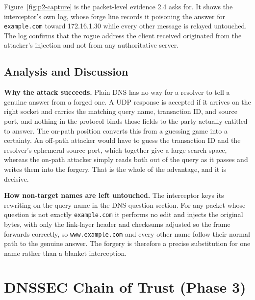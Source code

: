 \documentclass[11pt]{article}
\begin{document}
Figure~\ref{fig:p2-capture} is the packet-level evidence 2.4
asks for. It shows the interceptor's own log, whose forge line records it
poisoning the answer for \texttt{example.com} toward 172.16.1.30 while every other
message is relayed untouched. The log confirms that the rogue address the client
received originated from the attacker's injection and not from any authoritative
server.

\subsection{Analysis and Discussion}

\textbf{Why the attack succeeds.} Plain DNS has no way for a resolver to tell a
genuine answer from a forged one. A UDP response is accepted if it arrives on the
right socket and carries the matching query name, transaction ID, and source port,
and nothing in the protocol binds those fields to the party actually entitled to
answer. The on-path position converts this from a guessing game into a certainty.
An off-path attacker would have to guess the transaction ID and the resolver's
ephemeral source port, which together give a large search space, whereas the
on-path attacker simply reads both out of the query as it passes and writes them
into the forgery. That is the whole of the advantage, and it is decisive.

\textbf{How non-target names are left untouched.} The interceptor keys its
rewriting on the query name in the DNS question section. For any packet whose
question is not exactly \texttt{example.com} it performs no edit and injects the
original bytes, with only the link-layer header and checksums adjusted so the frame
forwards correctly, so \texttt{www.example.com} and every other name follow their
normal path to the genuine answer. The forgery is therefore a precise substitution
for one name rather than a blanket interception.


\clearpage

\section{DNSSEC Chain of Trust (Phase 3)}
\end{document}
